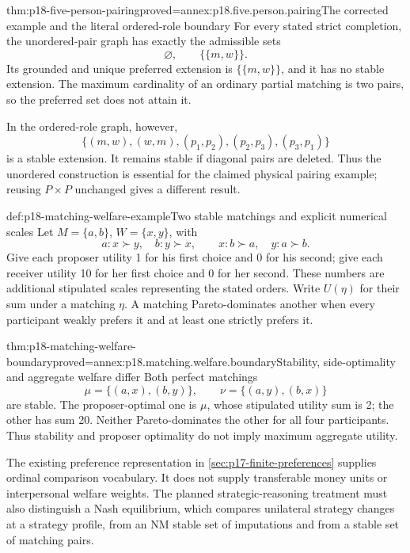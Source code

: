\begin{hbtheorem}{thm:p18-five-person-pairing}{proved=annex:p18.five.person.pairing}{The corrected example and the literal ordered-role boundary}
For every stated strict completion, the
unordered-pair graph has exactly the
admissible sets
\[
                            \varnothing,\qquad \{\{m,w\}\}.
\]
Its grounded and unique preferred
extension is \(\{\{m,w\}\}\), and
it has no stable extension.
The maximum cardinality of an ordinary
partial matching is two pairs, so
the preferred set does not attain it.

In the ordered-role graph, however,
\[
 \{(m,w),(w,m),(p_1,p_2),(p_2,p_3),(p_3,p_1)\}
\]
is a stable extension. It remains
stable if diagonal pairs are deleted.
Thus the unordered construction is
essential for the claimed physical
pairing example; reusing \(P\times P\)
unchanged gives a different result.
\end{hbtheorem}

\begin{hbdefinition}{def:p18-matching-welfare-example}{Two stable matchings and explicit numerical scales}
Let \(M=\{a,b\}\), \(W=\{x,y\}\), with
\[
 a:x\succ y,\quad b:y\succ x,\qquad
 x:b\succ a,\quad y:a\succ b.
\]
Give each proposer utility 1 for his
first choice and 0 for his second;
give each receiver utility 10 for her
first choice and 0 for her second.
These numbers are additional stipulated
scales representing the stated orders.
Write \(U(\eta)\) for their sum under
a matching \(\eta\). A matching Pareto-dominates
another when every participant weakly prefers
it and at least one strictly prefers it.
\end{hbdefinition}

\begin{hbtheorem}{thm:p18-matching-welfare-boundary}{proved=annex:p18.matching.welfare.boundary}{Stability, side-optimality and aggregate welfare differ}
Both perfect matchings
\[
             \mu=\{(a,x),(b,y)\},\qquad
             \nu=\{(a,y),(b,x)\}
\]
are stable. The proposer-optimal one
is \(\mu\), whose stipulated utility
sum is 2; the other has sum 20.
Neither Pareto-dominates the other
for all four participants.
Thus stability and proposer optimality
do not imply maximum aggregate utility.
\end{hbtheorem}

The existing preference representation
in \cref{sec:p17-finite-preferences}
supplies ordinal comparison vocabulary.
It does not supply transferable money
units or interpersonal welfare weights.
The planned strategic-reasoning treatment
must also distinguish a Nash equilibrium,
which compares unilateral strategy changes
at a strategy profile, from an NM stable
set of imputations and from a stable
set of matching pairs.

